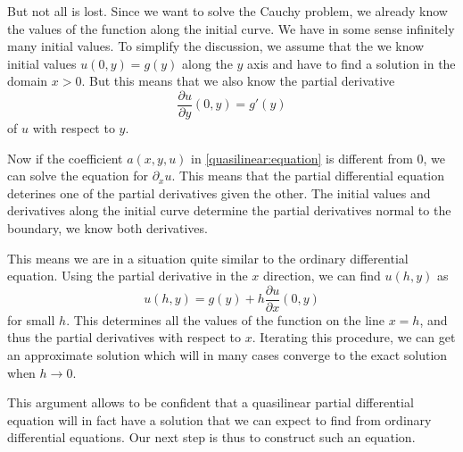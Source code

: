 But not all is lost.
Since we want to solve the Cauchy problem, we already know the 
values of the function along the initial curve.
We have in some sense infinitely many initial values.
To simplify the discussion, we assume that the we know initial values
$u(0,y) = g(y)$ along the $y$ axis and have to find a solution in the domain
$x>0$.
But this means that we also know the partial derivative
\[
\frac{\partial u}{\partial y}(0,y) = g'(y)
\]
of $u$ with respect to $y$.

Now if the coefficient $a(x,y,u)$ in \eqref{quasilinear:equation}
is different from $0$, we can solve the equation for $\partial_x u$.
This means that the partial differential equation deterines one of
the partial derivatives given the other.
The initial values and derivatives along the initial curve determine
the partial derivatives normal to the boundary, we know both derivatives.

This means we are in a situation quite similar to the ordinary
differential equation.
Using the partial derivative in the $x$ direction, we can find
$u(h,y)$ as
\[
u(h,y) = g(y) + h\frac{\partial u}{\partial x}(0,y)
\]
for small $h$.
This determines all the values of the function on the line $x=h$,
and thus the partial derivatives with respect to $x$.
Iterating this procedure, we can get an approximate solution
which will in many cases converge to the exact solution when $h\to 0$.

This argument allows to be confident that a quasilinear partial
differential equation will in fact have a solution that we can expect
to find from ordinary differential equations.
Our next step is thus to construct such an equation.

